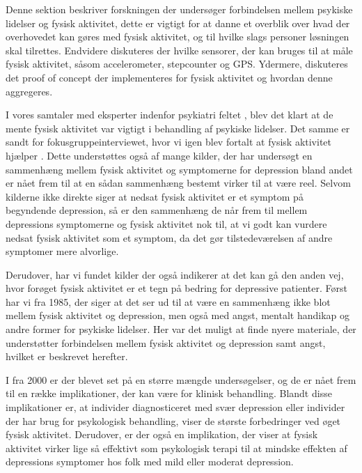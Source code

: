Denne sektion beskriver forskningen der undersøger forbindelsen mellem psykiske lidelser og fysisk aktivitet, dette er vigtigt for at danne et overblik over hvad der overhovedet kan gøres med fysisk aktivitet, og til hvilke slags personer løsningen skal tilrettes.
Endvidere diskuteres der hvilke sensorer, der kan bruges til at måle fysisk aktivitet, såsom accelerometer, stepcounter og GPS.
Ydermere, diskuteres det proof of concept der implementeres for fysisk aktivitet og hvordan denne aggregeres. 

I vores samtaler med eksperter indenfor psykiatri feltet \citep[Kapitel 1, Sektion 3 og 4]{misc:faellesrapp}, blev det klart at de mente fysisk aktivitet var vigtigt i behandling af psykiske lidelser.
Det samme er sandt for fokusgruppeinterviewet, hvor vi igen blev fortalt at fysisk aktivitet hjælper \citep[Kapitel 1, Sektion 5]{misc:faellesrapp}.
Dette understøttes også af mange kilder, der har undersøgt en sammenhæng mellem fysisk aktivitet og symptomerne for depression bland andet \citet{art:physDepSymptoms, Strawbridge15082002, Arredondo01072012} er nået frem til at en sådan sammenhæng bestemt virker til at være reel.
Selvom kilderne ikke direkte siger at nedsat fysisk aktivitet er et symptom på begyndende depression, så er den sammenhæng de når frem til mellem depressions symptomerne og fysisk aktivitet nok til, at vi godt kan vurdere nedsat fysisk aktivitet som et symptom, da det gør tilstedeværelsen af andre symptomer mere alvorlige.

Derudover, har vi fundet kilder der også indikerer at det kan gå den anden vej, hvor forøget fysisk aktivitet er et tegn på bedring for depressive patienter.
Først har vi \citet{misc:healthReports} fra 1985, der siger at det ser ud til at være en sammenhæng ikke blot mellem fysisk aktivitet og depression, men også med angst, mentalt handikap og andre former for psykiske lidelser.
Her var det muligt at finde nyere materiale, der understøtter forbindelsen mellem fysisk aktivitet og depression samt angst, hvilket er beskrevet herefter.

I \citet{art:physMental} fra 2000 er der blevet set på en større mængde undersøgelser, og de er nået frem til en række implikationer, der kan være for klinisk behandling.
Blandt disse implikationer er, at individer diagnosticeret med svær depression eller individer der har brug for psykologisk behandling, viser de største forbedringer ved øget fysisk aktivitet.
Derudover, er der også en implikation, der viser at fysisk aktivitet virker lige så effektivt som psykologisk terapi til at mindske effekten af depressions symptomer hos folk med mild eller moderat depression.

